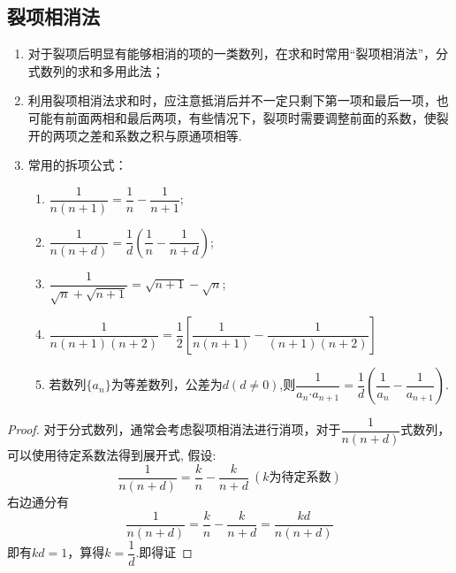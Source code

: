   \subsection{裂项相消法}
  \begin{enumerate}
  \item 对于裂项后明显有能够相消的项的一类数列，在求和时常用“裂项相消法”，分式数列的求和多用此法；
  \item 利用裂项相消法求和时，应注意抵消后并不一定只剩下第一项和最后一项，也可能有前面两相和最后两项，有些情况下，裂项时需要调整前面的系数，使裂开的两项之差和系数之积与原通项相等.
  \item 常用的拆项公式：\begin{enumerate}
  \item $ \dfrac{1}{n(n+1)}=\dfrac{1}{n}-\dfrac{1}{n+1}; $
  \item $ \dfrac{1}{n(n+d)}=\dfrac{1}{d}\left(\dfrac{1}{n}-\dfrac{1}{n+d}\right) $;
  \item $\dfrac{1}{\sqrt{n}+\sqrt{n+1}}=\sqrt{n+1}-\sqrt{n}$;
  \item $\dfrac{1}{n(n+1)(n+2)}=\dfrac{1}{2}\left[\dfrac{1}{n(n+1)}-\dfrac{1}{(n+1)(n+2)}\right]$
  \item 若数列$\{a_n\}$为等差数列，公差为$ d (d\ne0)$,则$ \dfrac{1}{a_n\bm{\cdot}a_{n+1}}=\dfrac{1}{d}\left(\dfrac{1}{a_n}-\dfrac{1}{a_{n+1}}\right). $
  \end{enumerate}
  \end{enumerate}
  \begin{proof}
  对于分式数列，通常会考虑裂项相消法进行消项，对于$ \dfrac{1}{n(n+d)} $式数列，可以使用待定系数法得到展开式,
  假设:$$ \dfrac{1}{n(n+d)}=\dfrac{k}{n}-\dfrac{k}{n+d} ~(k\text{为待定系数})$$
  右边通分有$$\dfrac{1}{n(n+d)}= \dfrac{k}{n}-\dfrac{k}{n+d}=\dfrac{kd}{n(n+d)} $$
  即有$ kd=1 $，算得$ k=\dfrac{1}{d} $.即得证
  \end{proof}
